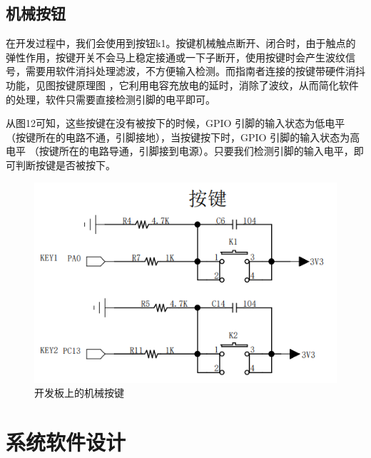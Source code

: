\documentclass[UTF8,a4paper,11pt]{article}
\begin{document}
\subsection{机械按钮}
在开发过程中，我们会使用到按钮k1。按键机械触点断开、闭合时，由于触点的弹性作用，按键开关不会马上稳定接通或一下子断开，使用按键时会产生波纹信号，需要用软件消抖处理滤波，不方便输入检测。而指南者连接的按键带硬件消抖功能，见图按键原理图 ，它利用电容充放电的延时，消除了波纹，从而简化软件的处理，软件只需要直接检测引脚的电平即可。

从图12可知，这些按键在没有被按下的时候，GPIO 引脚的输入状态为低电平 （按键所在的电路不通，引脚接地），当按键按下时，GPIO 引脚的输入状态为高电平 （按键所在的电路导通，引脚接到电源）。只要我们检测引脚的输入电平，即可判断按键是否被按下。

\begin{figure}[htbp]
    \centering
    \includegraphics{p12.png}
    \caption{开发板上的机械按键}
\end{figure} 
\clearpage

\section{系统软件设计}
\end{document}
